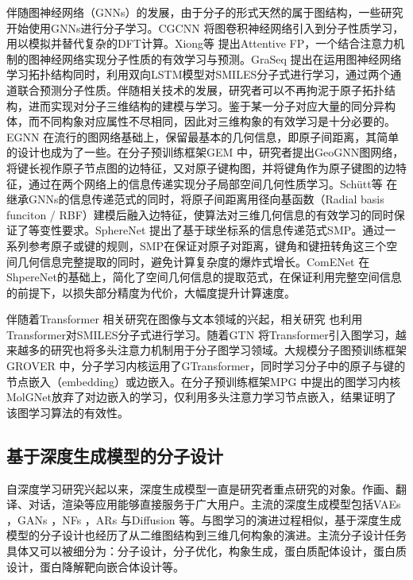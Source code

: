 伴随图神经网络（GNNs）的发展，由于分子的形式天然的属于图结构，一些研究开始使用GNNs进行分子学习。CGCNN \cite{cgcnn_xie_18}将图卷积神经网络引入到分子性质学习，用以模拟并替代复杂的DFT计算。Xiong等 \cite{attentivefp_xiong_20}提出Attentive FP，一个结合注意力机制的图神经网络实现分子性质的有效学习与预测。GraSeq \cite{graseq_guo_20}提出在运用图神经网络学习拓扑结构同时，利用双向LSTM模型对SMILES分子式进行学习，通过两个通道联合预测分子性质。伴随相关技术的发展，研究者可以不再拘泥于原子拓扑结构，进而实现对分子三维结构的建模与学习。鉴于某一分子对应大量的同分异构体，而不同构象对应属性不尽相同，因此对三维构象的有效学习是十分必要的。EGNN \cite{egnn_satorras_21}在流行的图网络基础上，保留最基本的几何信息，即原子间距离，其简单的设计也成为了一些。在分子预训练框架GEM \cite{gem_fang_22}中，研究者提出GeoGNN图网络，将键长视作原子节点图的边特征，又对原子键构图，并将键角作为原子键图的边特征，通过在两个网络上的信息传递实现分子局部空间几何性质学习。Sch\"{u}tt等 \cite{schnet_schutt_17}在继承GNNs的信息传递范式的同时，将原子间距离用径向基函数（Radial basis funciton / RBF）建模后融入边特征，使算法对三维几何信息的有效学习的同时保证了等变性要求。SphereNet \cite{spherenet_liu_22}提出了基于球坐标系的信息传递范式SMP。通过一系列参考原子或键的规则，SMP在保证对原子对距离，键角和键扭转角这三个空间几何信息完整提取的同时，避免计算复杂度的爆炸式增长。ComENet \cite{comenet_wang_22}在ShpereNet的基础上，简化了空间几何信息的提取范式，在保证利用完整空间信息的前提下，以损失部分精度为代价，大幅度提升计算速度。

伴随着Transformer \cite{transformer_vaswani_17}相关研究在图像与文本领域的兴起，相关研究 \cite{smilestrans_honda_19,smilesbert_wang_19,chemberta_chithrananda_20}也利用Transformer对SMILES分子式进行学习。随着GTN \cite{gtn_yun_19}将Transformer引入图学习，越来越多的研究也将多头注意力机制用于分子图学习领域。大规模分子图预训练框架GROVER \cite{grover_rong_20}中，分子学习内核运用了GTransformer，同时学习分子中的原子与键的节点嵌入（embedding）或边嵌入。在分子预训练框架MPG \cite{mpg_li_21}中提出的图学习内核MolGNet放弃了对边嵌入的学习，仅利用多头注意力学习节点嵌入，结果证明了该图学习算法的有效性。

\subsection{基于深度生成模型的分子设计}
自深度学习研究兴起以来，深度生成模型一直是研究者重点研究的对象。作画、翻译、对话，渲染等应用能够直接服务于广大用户。主流的深度生成模型包括VAEs \cite{vae_kingma_13}，GANs \cite{gan_goodfellow_14}，NFs \cite{nice_dinh_15,density_dinh_17}，ARs \cite{ar_oord_16}与Diffusion \cite{deepunsupervised_dickstein_15,generative_song_19}等。与图学习的演进过程相似，基于深度生成模型的分子设计也经历了从二维图结构到三维几何构象的演进。主流分子设计任务具体又可以被细分为：分子设计，分子优化，构象生成，蛋白质配体设计，蛋白质设计，蛋白降解靶向嵌合体设计等。

